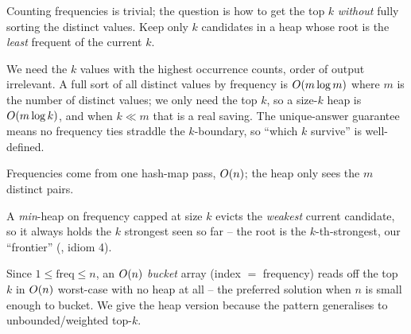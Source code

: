 \begin{attemptgate}
Counting frequencies is trivial; the question is how to get the top $k$ \emph{without} fully sorting the
distinct values. Keep only $k$ candidates in a heap whose root is the \emph{least} frequent of the current
$k$.
\end{attemptgate}

We need the $k$ values with the highest occurrence counts, order of output irrelevant. A full sort of all
distinct values by frequency is $O(m\log m)$ where $m$ is the number of distinct values; we only need
the top $k$, so a size-$k$ heap is $O(m\log k)$, and when $k \ll m$ that is a real saving. The unique-answer
guarantee means no frequency ties straddle the $k$-boundary, so ``which $k$ survive'' is well-defined.

\begin{observation}
Frequencies come from one hash-map pass, $O(n)$; the heap only sees the $m$ distinct  pairs.
\end{observation}
\begin{observation}
A \emph{min}-heap on frequency capped at size $k$ evicts the \emph{weakest} current candidate, so it
always holds the $k$ strongest seen so far -- the root is the $k$-th-strongest, our ``frontier''
(, idiom 4).
\end{observation}
\begin{observation}
Since $1 \le \text{freq} \le n$, an $O(n)$ \emph{bucket} array (index $=$ frequency) reads off the top
$k$ in $O(n)$ worst-case with no heap at all -- the preferred solution when $n$ is small enough to
bucket. We give the heap version because the pattern generalises to unbounded/weighted top-$k$.
\end{observation}


